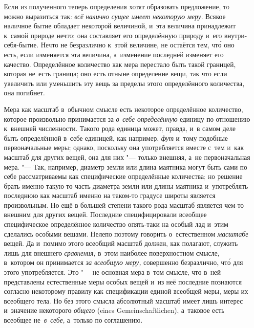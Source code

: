 Если из полученного теперь определения хотят образовать предложение, то можно
выразиться так: {\em всё налично сущее имеет некоторую меру}. Всякое наличное
бытие обладает некоторой величиной, и~эта величина принадлежит к~самой природе
нечто; она составляет его определённую природу и~его внутри-себя-бытие. Нечто
не безразлично к~этой величине, не остаётся тем, чт\'{о} оно есть, если
изменяется эта величина, а~изменение последней изменяет его качество.
Определённое количество как мера перестало быть такой границей, которая не~есть
граница; оно есть отныне определение вещи, так что если увеличить или уменьшить
эту вещь за пределы этого определённого количества, она погибнет.

Мера как масштаб в~обычном смысле есть некоторое определённое количество,
которое произвольно принимается за {\em в~себе определённую} единицу по
отношению к~внешней численности. Такого рода единица может, правда, и~в самом
деле быть определённой в~себе единицей, как например,
{\em фут} и~тому подобные первоначальные
меры; однако, поскольку она употребляется вместе с~тем и~как масштаб для других
вещей, она для них "--- только внешняя, а~не первоначальная мера. "--- Так,
например, диаметр земли или длина маятника могут быть сами по себе
рассматриваемы как специфические определённые количества; но решение брать
именно такую-то часть диаметра земли или длины маятника и~употреблять последнюю
как масштаб именно на таком-то градусе широты является произвольным. Но ещё в
большей степени такого рода масштаб является чем-то внешним для других вещей.
Последние специфицировали всеобщее специфическое определённое количество
опять-таки на особый лад и~этим сделались особыми вещами. Нелепо поэтому
говорить о~естественном {\em масштабе} вещей. Да и~помимо этого всеобщий
масштаб должен, как полагают, служить лишь для внешнего {\em сравнения;} в~этом
наиболее поверхностном смысле, в~котором он принимается {\em за всеобщую меру,}
совершенно безразлично, чт\'{о} для этого употребляется. Это "--- не основная
мера в~том смысле, что в~ней представлены естественные меры особых вещей и~из
неё последние познаются согласно некоторому правилу как спецификации единой
всеобщей меры, меры их всеобщего тела. Но без этого смысла абсолютный масштаб
имеет лишь интерес и~значение некоторого {\em общего}
(eines Gemein\-schaft\-li\-chen), а~таковое есть всеобщее
не~{\em в~себе,} а~только по соглашению.

